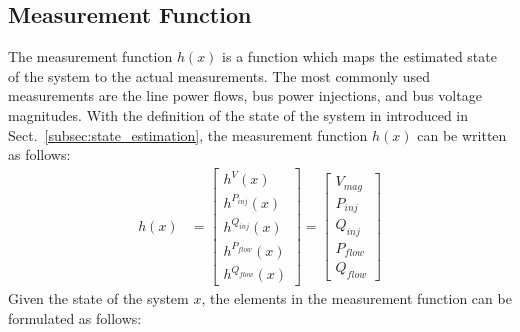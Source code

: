 \subsection{Measurement Function} \label{subsec:h}

The measurement function $h(x)$ is a function which maps the estimated state of the system to the actual measurements. The most commonly used measurements are the line power flows, bus power injections, and bus voltage magnitudes. With the definition of the state of the system in introduced in Sect.~\ref{subsec:state_estimation}, the measurement function $h(x)$ can be written as follows:
    \begin{align} 
    h(x) &=      
        \begin{bmatrix}
            h^V(x)\\[6pt]
            h^{P_{inj}}(x)\\[6pt]
            h^{Q_{inj}}(x)\\[6pt]
            h^{P_{flow}}(x)\\[6pt]        
            h^{Q_{flow}}(x)         
        \end{bmatrix}
        =
        \begin{bmatrix}
            V_{mag}\\[6pt]
            P_{inj}\\[6pt]
            Q_{inj}\\[6pt]
            P_{flow}\\[6pt]        
            Q_{flow}         
        \end{bmatrix}
	    \label{eq:measurement_function}
    \end{align} 
Given the state of the system $x$, the elements in the measurement function can be formulated as follows:
